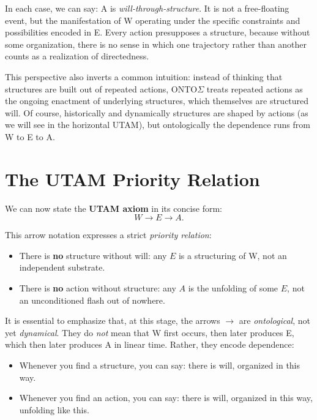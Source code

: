 \documentclass[12pt,a4paper]{report}
\newcommand{\Will}{W}
\newcommand{\Struct}{E}
\newcommand{\Act}{A}
\begin{document}
In each case, we can say: \Act{} is \emph{will-through-structure}. It is not a free-floating event, but the manifestation of \Will{} operating under the specific constraints and possibilities encoded in \Struct. Every action presupposes a structure, because without some organization, there is no sense in which one trajectory rather than another counts as a realization of directedness.

This perspective also inverts a common intuition: instead of thinking that structures are built out of repeated actions, ONTO$\Sigma$ treats repeated actions as the ongoing enactment of underlying structures, which themselves are structured will. Of course, historically and dynamically structures are shaped by actions (as we will see in the horizontal UTAM), but ontologically the dependence runs from \Will{} to \Struct{} to \Act.

\section{The UTAM Priority Relation}

We can now state the \textbf{UTAM axiom} in its concise form:
\[
    \Will \to \Struct \to \Act.
\]

This arrow notation expresses a strict \emph{priority relation}:

\begin{itemize}[leftmargin=2em]
    \item There is \textbf{no} structure without will: any \(\Struct\) is a structuring of \Will{}, not an independent substrate.
    \item There is \textbf{no} action without structure: any \(\Act\) is the unfolding of some \(\Struct\), not an unconditioned flash out of nowhere.
\end{itemize}

It is essential to emphasize that, at this stage, the arrows \(\to\) are \emph{ontological}, not yet \emph{dynamical}. They do \emph{not} mean that \Will{} first occurs, then later produces \Struct{}, which then later produces \Act{} in linear time. Rather, they encode dependence:

\begin{itemize}[leftmargin=2em]
    \item Whenever you find a structure, you can say: there is will, organized in this way.
    \item Whenever you find an action, you can say: there is will, organized in this way, unfolding like this.
\end{itemize}
\end{document}
